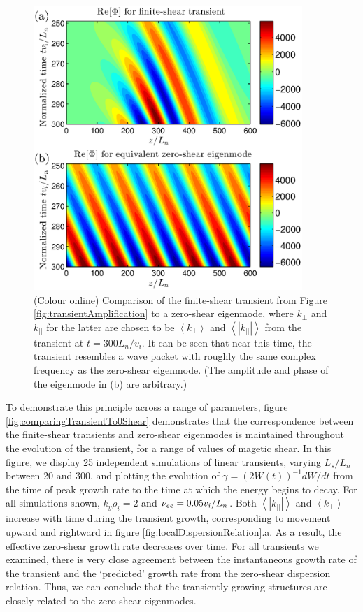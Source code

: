 \documentclass{jpp}
\begin{document}
\begin{figure}
\centerline{\includegraphics[width=4in]{fig2.eps}}
\caption{(Colour online)
Comparison of the finite-shear transient from Figure \ref{fig:transientAmplification} to a
zero-shear eigenmode, where $k_{\perp}$ and $k_{||}$ for the latter are chosen to be $\left<k_{\perp}\right>$ and $\left<|k_{||}|\right>$
from the transient at $t=300 L_n/v_i$.
It can be seen that near this time, the transient resembles a wave packet with roughly the same
complex frequency as the zero-shear eigenmode.
(The amplitude and phase of the eigenmode in (b) are arbitrary.)
\label{fig:comparingTransientTo0Shear_single}}
\end{figure}

To demonstrate this principle across a range of parameters,
figure  \ref{fig:comparingTransientTo0Shear} demonstrates that the
correspondence between the finite-shear transients and zero-shear eigenmodes
is maintained throughout the evolution of the transient, for a range of
values of magetic shear.
In this figure, we display 25 independent simulations of linear transients,
varying $L_s/L_n$ between 20 and 300, and plotting the evolution of $\gamma = (2W(t))^{-1} dW/dt$ from the time
of peak growth rate to the time at which the energy begins to decay.
For all simulations shown, $k_y \rho_i = 2$ and $\nu_{ee} = 0.05 v_i/L_n$.
Both $\left<|k_{||}|\right>$ and $\left< k_\perp \right>$ increase with time during the transient
growth, corresponding to movement upward and rightward in figure \ref{fig:localDispersionRelation}.a.
As a result, the effective zero-shear growth rate decreases over time.
For all transients we examined, there is very close agreement between the instantaneous growth rate of the transient
and the `predicted' growth rate from the zero-shear dispersion relation.
Thus, we can conclude that the transiently growing structures are closely related to the zero-shear
eigenmodes.  
\end{document}
